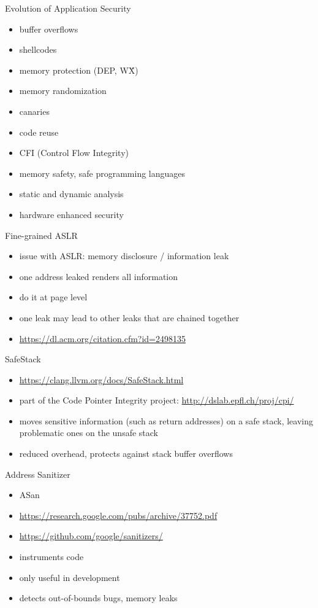 \documentclass{curs}
\begin{document}
\begin{frame}{Evolution of Application Security}
  \begin{itemize}
    \item buffer overflows
    \item shellcodes
    \item memory protection (DEP, W\^X)
    \item memory randomization
    \item canaries
    \item code reuse
    \item CFI (Control Flow Integrity)
    \item memory safety, safe programming languages
    \item static and dynamic analysis
    \item hardware enhanced security
  \end{itemize}
\end{frame}

\begin{frame}{Fine-grained ASLR}
  \begin{itemize}
    \item issue with ASLR: memory disclosure / information leak
    \item one address leaked renders all information
    \item do it at page level
    \item one leak may lead to other leaks that are chained together
    \item \url{https://dl.acm.org/citation.cfm?id=2498135}
  \end{itemize}
\end{frame}

\begin{frame}{SafeStack}
  \begin{itemize}
    \item \url{https://clang.llvm.org/docs/SafeStack.html}
    \item part of the Code Pointer Integrity project: \url{http://dslab.epfl.ch/proj/cpi/}
    \item moves sensitive information (such as return addresses) on a safe stack, leaving problematic ones on the unsafe stack
    \item reduced overhead, protects against stack buffer overflows
  \end{itemize}
\end{frame}

\begin{frame}{Address Sanitizer}
  \begin{itemize}
    \item ASan
    \item \url{https://research.google.com/pubs/archive/37752.pdf}
    \item \url{https://github.com/google/sanitizers/}
    \item instruments code
    \item only useful in development
    \item detects out-of-bounds bugs, memory leaks
  \end{itemize}
\end{frame}
\end{document}
